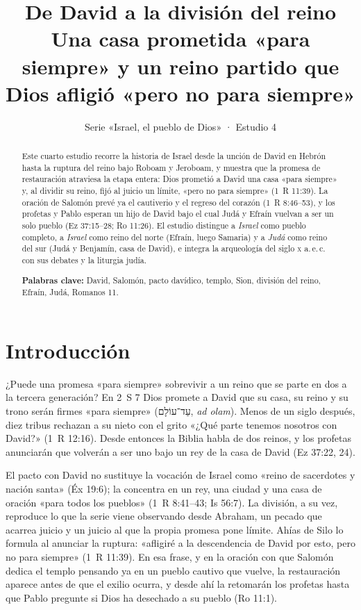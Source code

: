 \documentclass[11pt,letterpaper]{article}
\title{\color{ladrillo}\bfseries De David a la división del reino\\[4pt]\large\color{cafe}\mdseries Una casa prometida «para siempre» y un reino partido que Dios afligió «pero no para siempre»}
\author{}\date{\color{sepia}Serie «Israel, el pueblo de Dios» · Estudio 4}
\newcommand{\heb}[1]{\mbox{\foreignlanguage{hebrew}{#1}}}
\begin{document}
\maketitle\thispagestyle{empty}

\begin{abstract}\noindent
Este cuarto estudio recorre la historia de Israel desde la unción de David en Hebrón hasta la ruptura del reino bajo Roboam y Jeroboam, y muestra que la promesa de restauración atraviesa la etapa entera: Dios prometió a David una casa «para siempre» y, al dividir su reino, fijó al juicio un límite, «pero no para siempre» (1~R 11:39). La oración de Salomón prevé ya el cautiverio y el regreso del corazón (1~R 8:46--53), y los profetas y Pablo esperan un hijo de David bajo el cual Judá y Efraín vuelvan a ser un solo pueblo (Ez 37:15--28; Ro 11:26). El estudio distingue a \emph{Israel} como pueblo completo, a \emph{Israel} como reino del norte (Efraín, luego Samaria) y a \emph{Judá} como reino del sur (Judá y Benjamín, casa de David), e integra la arqueología del siglo \textsc{x} a.\,e.\,c. con sus debates y la liturgia judía.
\par\smallskip\noindent\textbf{Palabras clave:} David, Salomón, pacto davídico, templo, Sion, división del reino, Efraín, Judá, Romanos 11.
\end{abstract}

\section{Introducción}

¿Puede una promesa «para siempre» sobrevivir a un reino que se parte en dos a la tercera generación? En 2~S 7 Dios promete a David que su casa, su reino y su trono serán firmes «para siempre» (\heb{עַד־עוֹלָם}, \emph{ad olam}). Menos de un siglo después, diez tribus rechazan a su nieto con el grito «¿Qué parte tenemos nosotros con David?» (1~R 12:16). Desde entonces la Biblia habla de dos reinos, y los profetas anunciarán que volverán a ser uno bajo un rey de la casa de David (Ez 37:22, 24).

El pacto con David no sustituye la vocación de Israel como «reino de sacerdotes y nación santa» (Éx 19:6); la concentra en un rey, una ciudad y una casa de oración «para todos los pueblos» (1~R 8:41--43; Is 56:7). La división, a su vez, reproduce lo que la serie viene observando desde Abraham, un pecado que acarrea juicio y un juicio al que la propia promesa pone límite. Ahías de Silo lo formula al anunciar la ruptura: «afligiré a la descendencia de David por esto, pero no para siempre» (1~R 11:39). En esa frase, y en la oración con que Salomón dedica el templo pensando ya en un pueblo cautivo que vuelve, la restauración aparece antes de que el exilio ocurra, y desde ahí la retomarán los profetas hasta que Pablo pregunte si Dios ha desechado a su pueblo (Ro 11:1).
\end{document}
